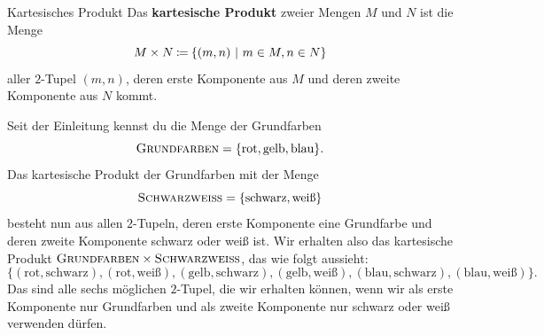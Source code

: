 \documentclass[../../main.tex]{subfiles}
\begin{document}
\begin{definition}{Kartesisches Produkt}
    Das \textbf{kartesische Produkt} zweier Mengen $M$ und $N$ ist die Menge
    \[M\times N\mathbin{\coloneqq}\{(m,n)~|~m\in M, n\in N\}\]
    aller $2$-Tupel $(m,n)$, deren erste Komponente aus $M$ und deren zweite Komponente aus $N$ kommt.
\end{definition}

\begin{example}{}
    Seit der Einleitung kennst du die Menge der Grundfarben
    \[\textsc{Grundfarben}=\{\text{rot},\text{gelb},\text{blau}\}.\]
    Das kartesische Produkt der Grundfarben mit der Menge
    \[\textsc{Schwarzweiß}=\{\text{schwarz},\text{weiß}\}\] besteht nun aus allen $2$-Tupeln, deren erste Komponente eine Grundfarbe und deren zweite Komponente schwarz oder weiß ist. Wir erhalten also das kartesische Produkt $\textsc{Grundfarben}\times\textsc{Schwarzweiß}$, das wie folgt aussieht:
    \[\{(\text{rot},\text{schwarz}),(\text{rot},\text{weiß}),(\text{gelb},\text{schwarz}),(\text{gelb},\text{weiß}),(\text{blau},\text{schwarz}),(\text{blau},\text{weiß})\}.\]
    Das sind alle sechs möglichen $2$-Tupel, die wir erhalten können, wenn wir als erste Komponente nur Grundfarben und als zweite Komponente nur schwarz oder weiß verwenden dürfen.
\end{example}
\end{document}
